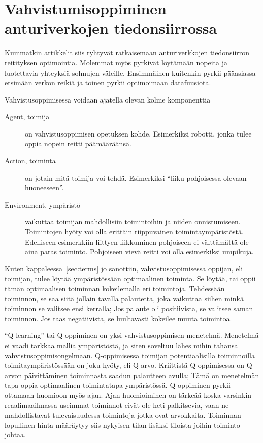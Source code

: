 
\section{Vahvistumisoppiminen anturiverkojen tiedonsiirrossa}

Kummatkin artikkelit siis ryhtyvät ratkaisemaan anturiverkkojen tiedonsiirron
reitityksen optimointia. Molemmat myös pyrkivät löytämään nopeita ja
luotettavia yhteyksiä solmujen väleille. Ensimmäinen kuitenkin pyrkii
pääasiassa etsimään verkon reikiä ja toinen pyrkii optimoimaan datafuusiota.

Vahvistusoppimisessa voidaan ajatella olevan kolme komponenttia
\begin{description}
  \item[Agent, toimija] on vahvistusoppimisen opetuksen kohde. Esimerkiksi
    robotti, jonka tulee oppia nopein reitti päämääräänsä.
  \item[Action, toiminta] on jotain mitä toimija voi tehdä. Esimerkiksi ``liiku
    pohjoisessa olevaan huoneeseen''.
  \item[Environment, ympäristö] vaikuttaa toimijan mahdollisiin toimintoihin ja
    niiden onnistumiseen. Toimintojen hyöty voi olla erittäin riippuvainen
    toimintaympäristöstä. Edelliseen esimerkkiin liittyen liikkuminen
    pohjoiseen ei välttämättä ole aina paras toiminto. Pohjoiseen vievä reitti
    voi olla esimerkiksi umpikuja.
\end{description}
Kuten kappaleessa~\ref{sec:terms} jo sanottiin, vahvistusoppimisessa oppijan,
eli toimijan, tulee löytää ympäristössään optimaalinen toiminta. Se löytää, tai
oppii tämän optimaalisen toiminnan kokeilemalla eri toimintoja. Tehdessään
toiminnon, se saa siitä jollain tavalla palautetta, joka vaikuttaa siihen minkä
toiminnon se valitsee ensi kerralla; Jos palaute oli positiivista, se valitsee
saman toiminnon. Jos taas negatiivista, se luultavasti kokeilee muuta
toimintoa.

``Q-learning'' tai Q-oppiminen on yksi vahvistusoppimisen menetelmä. Menetelmä
ei vaadi tarkkaa mallia ympäristöstä, ja siten soveltuu lähes mihin tahansa
vahvistusoppimisongelmaan.  Q-oppimisessa toimijan potentiaalisilla
toiminnoilla toimitaympäristössään on joku hyöty, eli Q-arvo. Kriittistä
Q-oppimisessa on Q-arvon päivittäminen toiminnasta saadun palautteen avulla;
Tämä on menetelmän tapa oppia optimaalinen toimintatapa ympäristössä.
Q-oppiminen pyrkii ottamaan huomioon myös ajan. Ajan huomioiminen on tärkeää
koska varsinkin reaalimaailmassa useimmat toiminnot eivät ole heti palkitsevia,
vaan ne mahdollistavat tulevaisuudessa toimintoja jotka ovat arvokkaita.
Toiminnan lopullinen hinta määräytyy siis nykyisen tilan lisäksi tiloista
joihin toiminto johtaa.~\parencite{Kaelbling1996}

